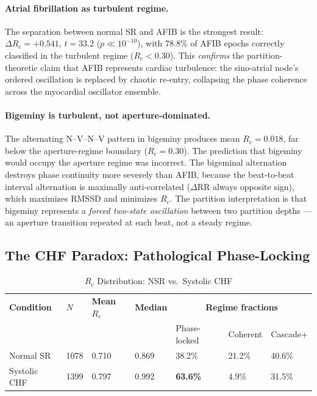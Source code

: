 \documentclass[10pt,twocolumn,a4paper]{article}
\theoremstyle{definition}
\begin{document}
\paragraph{Atrial fibrillation as turbulent regime.}
The separation between normal SR and AFIB is the strongest result:
$\Delta R_c = +0.541$, $t = 33.2$ ($p \ll 10^{-10}$), with 78.8\% of AFIB
epochs correctly classified in the turbulent regime ($R_c < 0.30$).
This \emph{confirms} the partition-theoretic claim that AFIB represents
cardiac turbulence: the sino-atrial node's ordered oscillation is replaced
by chaotic re-entry, collapsing the phase coherence across the myocardial
oscillator ensemble.

\paragraph{Bigeminy is turbulent, not aperture-dominated.}
The alternating N--V--N--V pattern in bigeminy produces mean $R_c = 0.018$,
far below the aperture-regime boundary ($R_c = 0.30$). The
prediction that bigeminy would occupy the aperture regime was incorrect.
The bigeminal alternation destroys phase continuity more severely than AFIB,
because the beat-to-beat interval alternation is maximally anti-correlated
($\Delta\text{RR}$ always opposite sign), which maximizes $\mathrm{RMSSD}$
and minimizes $R_c$. The partition interpretation is that bigeminy
represents a \emph{forced two-state oscillation} between two partition
depths --- an aperture transition repeated at each beat, not a steady regime.

\subsection{The CHF Paradox: Pathological Phase-Locking}

\begin{table}[H]
\centering
\caption{$R_c$ Distribution: NSR vs.\ Systolic CHF}
\label{tab:chf_paradox}
\begin{tabular}{lllllll}
\toprule
\textbf{Condition} & \textbf{$N$} & \textbf{Mean $R_c$} & \textbf{Median} &
\multicolumn{3}{c}{\textbf{Regime fractions}}\\
& & & & Phase-locked & Coherent & Cascade+\\
\midrule
Normal SR  & 1078 & 0.710 & 0.869 & 38.2\% & 21.2\% & 40.6\%\\
Systolic CHF & 1399 & 0.797 & 0.992 & \textbf{63.6\%} & 4.9\% & 31.5\%\\
\bottomrule
\end{tabular}
\end{table}
\end{document}
